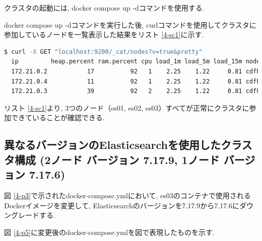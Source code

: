 クラスタの起動には, docker compose up -dコマンドを使用する.

docker compose up -dコマンドを実行した後, curlコマンドを使用してクラスタに参加しているノードを一覧表示した結果をリスト \ref{4-sc1}に示す.

\begin{lstlisting}[language=bash, caption=クラスタに参加しているノードを一覧表示した結果, label=4-sc1]
  $ curl -X GET "localhost:9200/_cat/nodes?v=true&pretty"
  ip         heap.percent ram.percent cpu load_1m load_5m load_15m node.role   master name
  172.21.0.2           17          92   1    2.25    1.22     0.81 cdfhilmrstw *      es02
  172.21.0.4           11          92   1    2.25    1.22     0.81 cdfhilmrstw -      es03
  172.21.0.3           39          92   2    2.25    1.22     0.81 cdfhilmrstw -      es01
\end{lstlisting}

リスト \ref{4-sc1}より, 3つのノード（es01, es02, es03）すべてが正常にクラスタに参加できていることが確認できる.

\subsection{異なるバージョンのElasticsearchを使用したクラスタ構成 (2ノード バージョン 7.17.9, 1ノード バージョン 7.17.6)}

図 \ref{4-p3}で示されたdocker-compose.ymlにおいて, es03のコンテナで使用されるDockerイメージを変更して, Elasticsearchのバージョンを7.17.9から7.17.6にダウングレードする.

図 \ref{4-p5}に変更後のdocker-compose.ymlを図で表現したものを示す.

